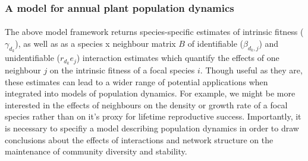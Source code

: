 \begin{refsection}
        \subsubsection{A model for annual plant population dynamics}
        \label{SI:popdyn}

        \paragraph{}
        The above model framework returns species-specific estimates of intrinsic fitness ($\gamma_{d_k}$), as well as as a species x neighbour matrix $B$ of identifiable ($\beta_{d_k, j}$) and unidentifiable ($r_{d_k} e_j$) interaction estimates which quantify the effects of one neighbour $j$ on the intrinsic fitness of a focal species $i$. Though useful as they are, these estimates can lead to a wider range of potential applications when integrated into models of population dynamics. For example, we might be more interested in the effects of neighbours on the density or growth rate of a focal species rather than on it's proxy for lifetime reproductive success. Importantly, it is necessary to specifiy a model describing population dynamics in order to draw conclusions about the effects of interactions and network structure on the maintenance of community diversity and stability. 


\end{refsection}
